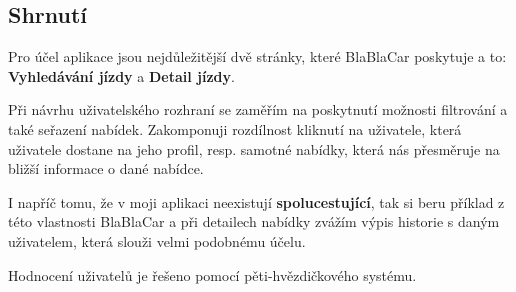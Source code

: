 
\newpage
\subsection{Shrnutí}
Pro účel aplikace jsou nejdůležitější dvě stránky, které BlaBlaCar poskytuje a to: \textbf{Vyhledávání jízdy} a \textbf{Detail jízdy}.

Při návrhu uživatelského rozhraní se zaměřím na poskytnutí možnosti filtrování a také seřazení nabídek. Zakomponuji rozdílnost kliknutí na uživatele, která uživatele dostane na jeho profil, resp. samotné nabídky, která nás přesměruje na bližší informace o dané nabídce.

I napříč tomu, že v moji aplikaci neexistují \textbf{spolucestující}, tak si beru příklad z této vlastnosti BlaBlaCar a při detailech nabídky zvážím výpis historie s daným uživatelem, která slouži velmi podobnému účelu.

Hodnocení uživatelů je řešeno pomocí pěti-hvězdičkového systému.